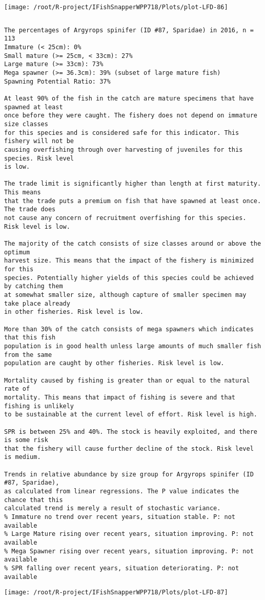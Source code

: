 \documentclass{report}\usepackage[]{graphicx}\usepackage[]{color}
\makeatletter
\def\maxwidth{ %
  \ifdim\Gin@nat@width>\linewidth
    \linewidth
  \else
    \Gin@nat@width
  \fi
}
\newenvironment{kframe}{%
 \def\at@end@of@kframe{}%
 \ifinner\ifhmode%
  \def\at@end@of@kframe{\end{minipage}}%
  \begin{minipage}{\columnwidth}%
 \fi\fi%
 \def\FrameCommand##1{\hskip\@totalleftmargin \hskip-\fboxsep
 \colorbox{shadecolor}{##1}\hskip-\fboxsep
     \hskip-\linewidth \hskip-\@totalleftmargin \hskip\columnwidth}%
 \MakeFramed {\advance\hsize-\width
   \@totalleftmargin\z@ \linewidth\hsize
   \@setminipage}}%
 {\par\unskip\endMakeFramed%
 \at@end@of@kframe}
\newenvironment{knitrout}{}{} %
\makeatother
\begin{document}
\begin{knitrout}
\texttt{[image: /root/R-project/IFishSnapperWPP718/Plots/plot-LFD-86]} 
\begin{kframe}\begin{verbatim}
\end{verbatim}
\end{kframe}
\clearpage
\newpage
\begin{kframe}\begin{verbatim}The percentages of Argyrops spinifer (ID #87, Sparidae) in 2016, n = 113
Immature (< 25cm): 0%
Small mature (>= 25cm, < 33cm): 27%
Large mature (>= 33cm): 73%
Mega spawner (>= 36.3cm): 39% (subset of large mature fish)
Spawning Potential Ratio: 37%
 
At least 90% of the fish in the catch are mature specimens that have spawned at least
once before they were caught. The fishery does not depend on immature size classes
for this species and is considered safe for this indicator. This fishery will not be
causing overfishing through over harvesting of juveniles for this species. Risk level
is low.

The trade limit is significantly higher than length at first maturity.  This means
that the trade puts a premium on fish that have spawned at least once. The trade does
not cause any concern of recruitment overfishing for this species. Risk level is low.

The majority of the catch consists of size classes around or above the optimum
harvest size. This means that the impact of the fishery is minimized for this
species. Potentially higher yields of this species could be achieved by catching them
at somewhat smaller size, although capture of smaller specimen may take place already
in other fisheries. Risk level is low.

More than 30% of the catch consists of mega spawners which indicates that this fish
population is in good health unless large amounts of much smaller fish from the same
population are caught by other fisheries. Risk level is low.
 
Mortality caused by fishing is greater than or equal to the natural rate of
mortality. This means that impact of fishing is severe and that fishing is unlikely
to be sustainable at the current level of effort. Risk level is high.
 
SPR is between 25% and 40%. The stock is heavily exploited, and there is some risk
that the fishery will cause further decline of the stock. Risk level is medium.
 
Trends in relative abundance by size group for Argyrops spinifer (ID #87, Sparidae),
as calculated from linear regressions. The P value indicates the chance that this
calculated trend is merely a result of stochastic variance.
% Immature no trend over recent years, situation stable. P: not available
% Large Mature rising over recent years, situation improving. P: not available
% Mega Spawner rising over recent years, situation improving. P: not available
% SPR falling over recent years, situation deteriorating. P: not available
\end{verbatim}
\end{kframe}
\texttt{[image: /root/R-project/IFishSnapperWPP718/Plots/plot-LFD-87]} 


\end{knitrout}
\end{document}
